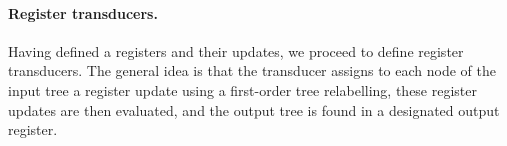 
\paragraph*{Register transducers.} Having defined a registers and their updates, we proceed to define register transducers. The general idea is that the transducer assigns to each node of the input tree a register update using a first-order tree relabelling, these register updates are then evaluated, and the output tree is found in a designated output register. 



